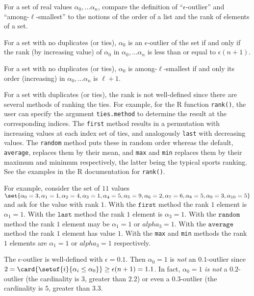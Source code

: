 \documentclass[12pt]{article}
\begin{document}
\begin{exercise}
    For a set of real values \( \alpha_0, \dots \alpha_n \), compare the
    definition of ``\( \epsilon \)-outlier'' and ``among-\( \ell \)-smallest''
    to the notions of the order of a list and the rank of elements of a
    set.
\end{exercise}
\begin{solution}
    For a set with no duplicates (or ties), \( \alpha_0 \) is an \(
    \epsilon \)-outlier of the set if and only if the rank (by
    increasing value) of \( \alpha_0 \) in \( \alpha_0, \dots \alpha_n \)
    is less than or equal to \( \epsilon(n+1) \).

    For a set with no duplicates (or ties), \( \alpha_0 \) is among-\(
    \ell \)-smallest if and only its order (increasing) in \( \alpha_0,
    \dots \alpha_n \) is \( \ell + 1 \).

    For a set with duplicates (or ties), the rank is not well-defined
    since there are several methods of ranking the ties.  For example,
    for the R function \texttt{rank()}, the user can specify the
    argument \texttt{ties.method} to determine the result at the
    corresponding indices.  The \texttt{first} method results in a
    permutation with increasing values at each index set of ties, and
    analogously \texttt{last} with decreasing values.  The \texttt{random}
    method puts these in random order whereas the default, \texttt{average},
    replaces them by their mean, and \texttt{max} and \texttt{min}
    replaces them by their maximum and minimum respectively, the latter
    being the typical sports ranking.  See the examples in the R
    documentation for \texttt{rank()}.

    For example, consider the set of \( 11 \) values
    \( \set{\alpha_0 = 3, \alpha_1 = 1, \alpha_2 = 4, \alpha_3 = 1,
      \alpha_4 = 5, \alpha_5 = 9, \alpha_6 = 2, \alpha_7 = 6, \alpha_8
      = 5, \alpha_9 = 3, \alpha_{10} = 5} \) and ask for the value
    with rank \( 1 \).  With the \( \texttt{first} \) method the rank
    \( 1 \) element is \( \alpha_1 = 1 \).  With the
    \( \texttt{last} \) method the rank \( 1 \) element is
    \( \alpha_3 = 1 \).  With the \( \texttt{random} \) method the
    rank \( 1 \) element may be \( \alpha_1 = 1 \) or
    \( alpha_3 = 1 \).  With the \( \texttt{average} \) method the
    rank \( 1 \) element has value \( 1 \).  With the \texttt{max} and \texttt{min}
    methods the rank \( 1 \) elements are \( \alpha_1 = 1 \) or
    \( alpha_3 = 1 \) respectively.

    The
    \( \epsilon \)-outlier
    is well-defined with \( \epsilon = 0.1 \).  Then \(
    \alpha_0 = 1 \) is \emph{not} an \( 0.1 \)-outlier since \( 2 =
    \card{%
    \setof{i}{\alpha_i \le \alpha_0}} \ge \epsilon(n+1) = 1.1 \).  In
  fact,  \( \alpha_0 = 1 \) \emph{is not} a \( 0.2 \)-outlier (the
  cardinality is \( 3 \), greater than \(2.2\))
  or even a \( 0.3 \)-outlier (the cardinality is \( 5 \), greater
  than \( 3.3 \).
\end{solution}
\end{document}
